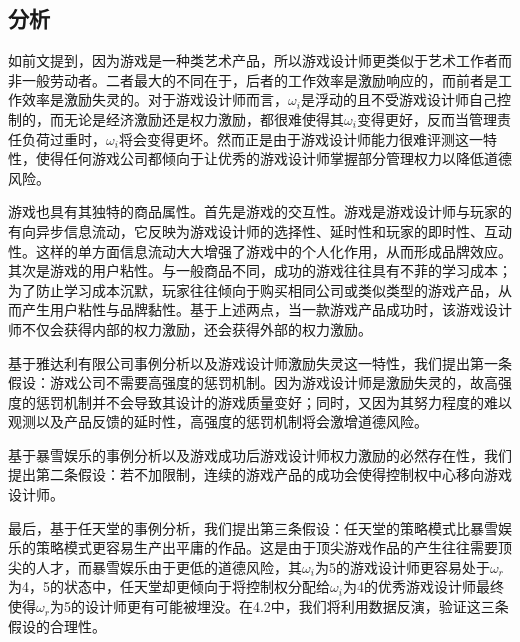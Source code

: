 \documentclass[hyperref]{ctexart}
\begin{document}
\begin{multicols}{2}
	\subsection{分析}
	如前文提到，因为游戏是一种类艺术产品，所以游戏设计师更类似于艺术工作者而非一般劳动者。二者最大的不同在于，后者的工作效率是激励响应的，而前者是工作效率是激励失灵的。对于游戏设计师而言，$\omega_i$是浮动的且不受游戏设计师自己控制的，而无论是经济激励还是权力激励，都很难使得其$\omega_i$变得更好，反而当管理责任负荷过重时，$\omega_i$将会变得更坏。然而正是由于游戏设计师能力很难评测这一特性，使得任何游戏公司都倾向于让优秀的游戏设计师掌握部分管理权力以降低道德风险。\par
	游戏也具有其独特的商品属性。首先是游戏的交互性。游戏是游戏设计师与玩家的有向异步信息流动，它反映为游戏设计师的选择性、延时性和玩家的即时性、互动性。这样的单方面信息流动大大增强了游戏中的个人化作用，从而形成品牌效应。其次是游戏的用户粘性。与一般商品不同，成功的游戏往往具有不菲的学习成本；为了防止学习成本沉默，玩家往往倾向于购买相同公司或类似类型的游戏产品，从而产生用户粘性与品牌黏性。基于上述两点，当一款游戏产品成功时，该游戏设计师不仅会获得内部的权力激励，还会获得外部的权力激励。\par
	基于雅达利有限公司事例分析以及游戏设计师激励失灵这一特性，我们提出第一条假设：游戏公司不需要高强度的惩罚机制。因为游戏设计师是激励失灵的，故高强度的惩罚机制并不会导致其设计的游戏质量变好；同时，又因为其努力程度的难以观测以及产品反馈的延时性，高强度的惩罚机制将会激增道德风险。\par
	基于暴雪娱乐的事例分析以及游戏成功后游戏设计师权力激励的必然存在性，我们提出第二条假设：若不加限制，连续的游戏产品的成功会使得控制权中心移向游戏设计师。\par
	最后，基于任天堂的事例分析，我们提出第三条假设：任天堂的策略模式比暴雪娱乐的策略模式更容易生产出平庸的作品。这是由于顶尖游戏作品的产生往往需要顶尖的人才，而暴雪娱乐由于更低的道德风险，其$\omega_i$为5的游戏设计师更容易处于$\omega_r$为4，5的状态中，任天堂却更倾向于将控制权分配给$\omega_i$为4的优秀游戏设计师最终使得$\omega_r$为5的设计师更有可能被埋没。在4.2中，我们将利用数据反演，验证这三条假设的合理性。

\end{multicols}
\end{document}
